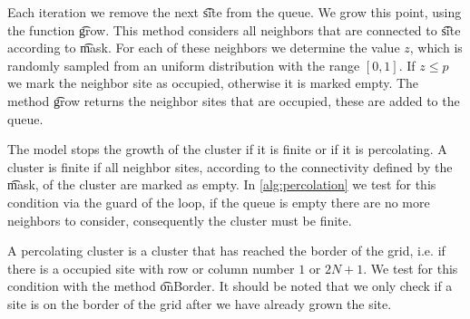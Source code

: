 Each iteration we remove the next \t{site} from the queue. We grow this point, using the function \t{grow}. This method considers all neighbors that are connected to \t{site} according to \t{mask}. For each of these neighbors we determine the value $z$, which is randomly sampled from an uniform distribution with the range $[0,1]$. If $z \leq p$ we mark the neighbor site as occupied, otherwise it is marked empty. The method \t{grow} returns the neighbor sites that are occupied, these are added to the queue. 

The model stops the growth of the cluster if it is finite or if it is percolating. A cluster is finite if all neighbor sites, according to the connectivity defined by the \t{mask}, of the cluster are marked as empty. In \cref{alg:percolation} we test for this condition via the guard of the loop, if the queue is empty there are no more neighbors to consider, consequently the cluster must be finite. 

A percolating cluster is a cluster that has reached the border of the grid, i.e. if there is a occupied site with row or column number $1$ or $2N + 1$. We test for this condition with the method \t{onBorder}. It should be noted that we only check if a site is on the border of the grid after we have already grown the site. 


